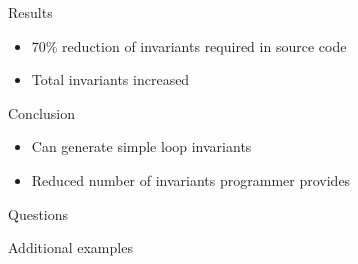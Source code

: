 \begin{frame}{Results}

\begin{itemize}
\item
  70\% reduction of invariants required in source code
\item
  Total invariants increased
\end{itemize}

\end{frame}

\begin{frame}{Conclusion}

\begin{itemize}
\item
  Can generate simple loop invariants
\item
  Reduced number of invariants programmer provides
\end{itemize}

\end{frame}

\begin{frame}

\begin{center}
    \Huge{Questions}
\end{center}

\end{frame}

\begin{frame}{Additional examples}

\end{frame}


